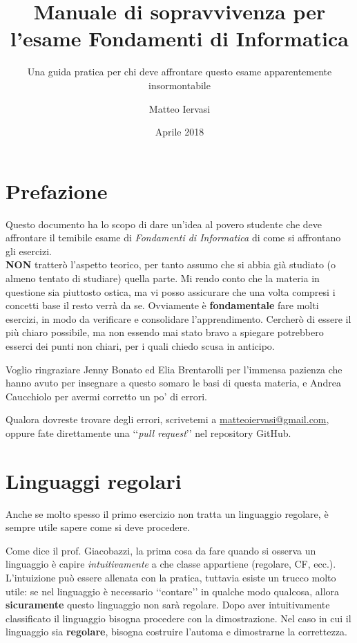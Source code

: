 \documentclass[a4paper,oneside]{scrbook}
\title{Manuale di sopravvivenza per l'esame Fondamenti di Informatica}
\subtitle{Una guida pratica per chi deve affrontare questo esame apparentemente insormontabile}
\author{Matteo Iervasi}
\date{Aprile 2018}
\begin{document}
	
\maketitle
\tableofcontents

\chapter*{Prefazione}
Questo documento ha lo scopo di dare un'idea al povero studente che deve affrontare il temibile esame di \textit{Fondamenti di Informatica} di come si affrontano gli esercizi.\\
\textbf{{\large NON}} tratterò l'aspetto teorico, per tanto assumo che si abbia già studiato (o almeno tentato di studiare) quella parte.
Mi rendo conto che la materia in questione sia piuttosto ostica, ma vi posso assicurare che una volta compresi i concetti base il resto verrà da se.
Ovviamente è \textbf{fondamentale} fare molti esercizi, in modo da verificare e consolidare l'apprendimento. Cercherò di essere il più chiaro possibile, ma non essendo mai stato bravo
a spiegare potrebbero esserci dei punti non chiari, per i quali chiedo scusa in anticipo.

Voglio ringraziare Jenny Bonato ed Elia Brentarolli per l'immensa pazienza che hanno avuto per insegnare a questo somaro le basi di questa materia, e Andrea Caucchiolo per avermi corretto un po' di errori.

Qualora dovreste trovare degli errori, scrivetemi a \href{mailto:matteoiervasi@gmail.com}{matteoiervasi@gmail.com}, oppure fate direttamente una ‘‘\textit{pull request}’’ nel repository GitHub.

\chapter{Linguaggi regolari}
Anche se molto spesso il primo esercizio non tratta un linguaggio regolare, è sempre utile sapere come si deve procedere.

Come dice il prof. Giacobazzi, la prima cosa da fare quando si osserva un linguaggio è capire \textit{intuitivamente} a che classe appartiene (regolare, CF, ecc.).
L'intuizione può essere allenata con la pratica, tuttavia esiste un trucco molto utile: se nel linguaggio è necessario ‘‘contare’’ in qualche modo qualcosa, allora \textbf{sicuramente}
questo linguaggio non sarà regolare. Dopo aver intuitivamente classificato il linguaggio bisogna procedere con la dimostrazione. Nel caso in cui il linguaggio sia \textbf{regolare}, bisogna costruire l'automa e dimostrarne la correttezza.
\end{document}
